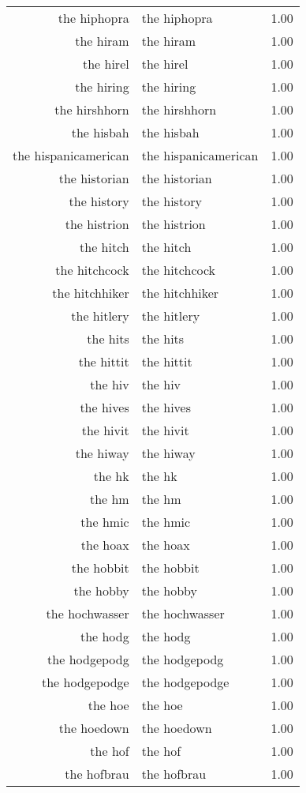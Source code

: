 \begin{table}[ht]
\begin{tabular}{rlr}
  the hiphopra & the hiphopra & 1.00 \\ 
  the hiram & the hiram & 1.00 \\ 
  the hirel & the hirel & 1.00 \\ 
  the hiring & the hiring & 1.00 \\ 
  the hirshhorn & the hirshhorn & 1.00 \\ 
  the hisbah & the hisbah & 1.00 \\ 
  the hispanicamerican & the hispanicamerican & 1.00 \\ 
  the historian & the historian & 1.00 \\ 
  the history & the history & 1.00 \\ 
  the histrion & the histrion & 1.00 \\ 
  the hitch & the hitch & 1.00 \\ 
  the hitchcock & the hitchcock & 1.00 \\ 
  the hitchhiker & the hitchhiker & 1.00 \\ 
  the hitlery & the hitlery & 1.00 \\ 
  the hits & the hits & 1.00 \\ 
  the hittit & the hittit & 1.00 \\ 
  the hiv & the hiv & 1.00 \\ 
  the hives & the hives & 1.00 \\ 
  the hivit & the hivit & 1.00 \\ 
  the hiway & the hiway & 1.00 \\ 
  the hk & the hk & 1.00 \\ 
  the hm & the hm & 1.00 \\ 
  the hmic & the hmic & 1.00 \\ 
  the hoax & the hoax & 1.00 \\ 
  the hobbit & the hobbit & 1.00 \\ 
  the hobby & the hobby & 1.00 \\ 
  the hochwasser & the hochwasser & 1.00 \\ 
  the hodg & the hodg & 1.00 \\ 
  the hodgepodg & the hodgepodg & 1.00 \\ 
  the hodgepodge & the hodgepodge & 1.00 \\ 
  the hoe & the hoe & 1.00 \\ 
  the hoedown & the hoedown & 1.00 \\ 
  the hof & the hof & 1.00 \\ 
  the hofbrau & the hofbrau & 1.00 \\ 

\end{tabular}
\end{table}
